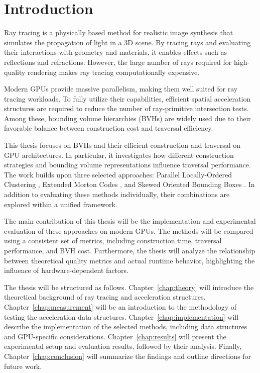 \chapter{Introduction} %
\setcounter{page}{1}

Ray tracing is a physically based method for realistic image synthesis that simulates the propagation of light in a 3D scene. By tracing rays and evaluating their interactions with geometry and materials, it enables effects such as reflections and refractions. However, the large number of rays required for high-quality rendering makes ray tracing computationally expensive.

Modern GPUs provide massive parallelism, making them well suited for ray tracing workloads. To fully utilize their capabilities, efficient spatial acceleration structures are required to reduce the number of ray-primitive intersection tests. Among these, bounding volume hierarchies (BVHs) are widely used due to their favorable balance between construction cost and traversal efficiency.

This thesis focuses on BVHs and their efficient construction and traversal on GPU architectures. In particular, it investigates how different construction strategies and bounding volume representations influence traversal performance. The work builds upon three selected approaches: Parallel Locally-Ordered Clustering \cite{MB17}, Extended Morton Codes \cite{Vinkler2017}, and Skewed Oriented Bounding Boxes \cite{KB25}. In addition to evaluating these methods individually, their combinations are explored within a unified framework.

The main contribution of this thesis will be the implementation and experimental evaluation of these approaches on modern GPUs. The methods will be compared using a consistent set of metrics, including construction time, traversal performance, and BVH cost. Furthermore, the thesis will analyze the relationship between theoretical quality metrics and actual runtime behavior, highlighting the influence of hardware-dependent factors.

The thesis will be structured as follows. Chapter~\ref{chap:theory} will introduce the theoretical background of ray tracing and acceleration structures. Chapter~\ref{chap:measurement} will be an introduction to the methodology of testing the acceleration data structures. Chapter~\ref{chap:implementation} will describe the implementation of the selected methods, including data structures and GPU-specific considerations. Chapter~\ref{chap:results} will present the experimental setup and evaluation results, followed by their analysis. Finally, Chapter~\ref{chap:conclusion} will summarize the findings and outline directions for future work.

